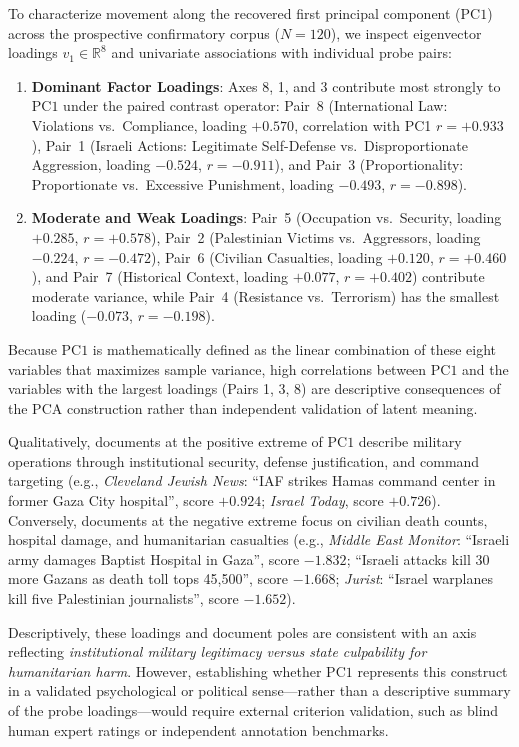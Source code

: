 To characterize movement along the recovered first principal component ($\mathrm{PC1}$) across the prospective confirmatory corpus ($N=120$), we inspect eigenvector loadings $v_1 \in \mathbb{R}^8$ and univariate associations with individual probe pairs:
\begin{enumerate}
    \item \textbf{Dominant Factor Loadings}: Axes 8, 1, and 3 contribute most strongly to $\mathrm{PC1}$ under the paired contrast operator: Pair~8 (International Law: Violations vs.\ Compliance, loading $+0.570$, correlation with PC1 $r = +0.933$), Pair~1 (Israeli Actions: Legitimate Self-Defense vs.\ Disproportionate Aggression, loading $-0.524$, $r = -0.911$), and Pair~3 (Proportionality: Proportionate vs.\ Excessive Punishment, loading $-0.493$, $r = -0.898$).
    \item \textbf{Moderate and Weak Loadings}: Pair~5 (Occupation vs.\ Security, loading $+0.285$, $r = +0.578$), Pair~2 (Palestinian Victims vs.\ Aggressors, loading $-0.224$, $r = -0.472$), Pair~6 (Civilian Casualties, loading $+0.120$, $r = +0.460$), and Pair~7 (Historical Context, loading $+0.077$, $r = +0.402$) contribute moderate variance, while Pair~4 (Resistance vs.\ Terrorism) has the smallest loading ($-0.073$, $r = -0.198$).
\end{enumerate}

Because $\mathrm{PC1}$ is mathematically defined as the linear combination of these eight variables that maximizes sample variance, high correlations between $\mathrm{PC1}$ and the variables with the largest loadings (Pairs 1, 3, 8) are descriptive consequences of the PCA construction rather than independent validation of latent meaning.

Qualitatively, documents at the positive extreme of $\mathrm{PC1}$ describe military operations through institutional security, defense justification, and command targeting (e.g., \emph{Cleveland Jewish News}: ``IAF strikes Hamas command center in former Gaza City hospital'', score $+0.924$; \emph{Israel Today}, score $+0.726$). Conversely, documents at the negative extreme focus on civilian death counts, hospital damage, and humanitarian casualties (e.g., \emph{Middle East Monitor}: ``Israeli army damages Baptist Hospital in Gaza'', score $-1.832$; ``Israeli attacks kill 30 more Gazans as death toll tops 45,500'', score $-1.668$; \emph{Jurist}: ``Israel warplanes kill five Palestinian journalists'', score $-1.652$).

Descriptively, these loadings and document poles are consistent with an axis reflecting \emph{institutional military legitimacy versus state culpability for humanitarian harm}. However, establishing whether $\mathrm{PC1}$ represents this construct in a validated psychological or political sense---rather than a descriptive summary of the probe loadings---would require external criterion validation, such as blind human expert ratings or independent annotation benchmarks.

